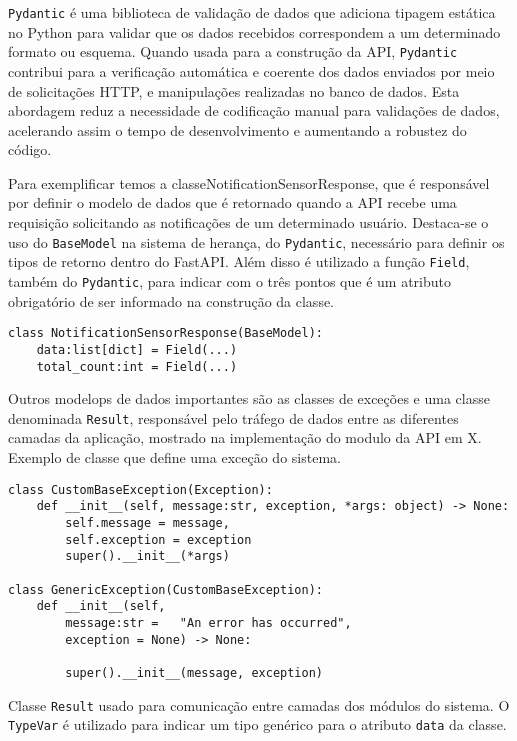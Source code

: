 \texttt{Pydantic} é uma biblioteca de validação de dados que adiciona tipagem estática no Python para validar que os dados recebidos correspondem a um determinado formato ou esquema. Quando usada para a construção da API, \texttt{Pydantic} contribui para a verificação automática e coerente dos dados enviados por meio de solicitações HTTP, e manipulações realizadas no banco de dados. Esta abordagem reduz a necessidade de codificação manual para validações de dados, acelerando assim o tempo de desenvolvimento e aumentando a robustez do código.

Para exemplificar temos a  classeNotificationSensorResponse, que é responsável por definir o modelo de dados que é retornado quando a API recebe uma requisição solicitando as notificações de um determinado usuário. Destaca-se o uso do \texttt{BaseModel} na sistema de herança, do \texttt{Pydantic}, necessário para definir os tipos de retorno dentro do FastAPI. Além disso é utilizado a função \texttt{Field}, também do \texttt{Pydantic}, para indicar com o três pontos que é um atributo obrigatório de ser informado na construção da classe.

\begin{verbatim}
class NotificationSensorResponse(BaseModel):
    data:list[dict] = Field(...)
    total_count:int = Field(...)
\end{verbatim}

Outros modelops de dados importantes são as classes de exceções e uma classe denominada \texttt{Result}, responsável pelo tráfego de dados entre as diferentes camadas da aplicação, mostrado na implementação do modulo da API em X.%
Exemplo de classe que define uma exceção do sistema.
\begin{verbatim}
class CustomBaseException(Exception):
    def __init__(self, message:str, exception, *args: object) -> None:
        self.message = message,
        self.exception = exception
        super().__init__(*args)

class GenericException(CustomBaseException):
    def __init__(self,
        message:str =   "An error has occurred",
        exception = None) -> None:

        super().__init__(message, exception)
\end{verbatim}


Classe \texttt{Result} usado para comunicação entre camadas dos módulos do sistema. O \texttt{TypeVar} é utilizado para indicar um tipo genérico para o atributo \texttt{data} da classe.

